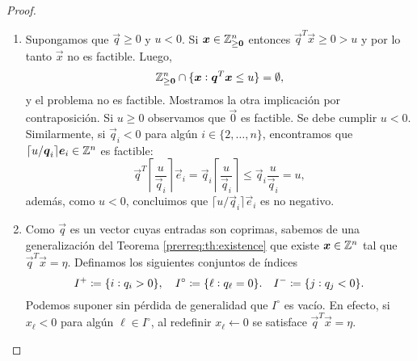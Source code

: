 \begin{proof} \hfill
	\begin{enumerate}
		\item Supongamos que $\vec{q} \geq 0$ y $u < 0$. Si $\boldsymbol{x} \in \mathbb{Z}_{\geq \boldsymbol{0}}^n$
			entonces $\vec{q}^T\vec{x} \geq 0 > u$ y por lo tanto $\vec{x}$ no es factible. Luego,
			\begin{equation*}
				\mathbb{Z}_{\geq \boldsymbol{0}}^{n} \cap \lbrace \boldsymbol{x} \vcentcolon \boldsymbol{q}^T\boldsymbol{x} 
				\leq u \rbrace = \emptyset,
			\end{equation*}
			y el problema no es factible. Mostramos la otra implicación por contraposición. Si $u
			\geq 0$ observamos que $\vec{0}$ es factible. Se debe cumplir $u < 0$. Similarmente, si
			$\vec{q}_i < 0$ para algún $i \in \lbrace 2, \ldots, n \rbrace$, encontramos que $\lceil
			u/\boldsymbol{q}_i \rceil\boldsymbol{e}_i \in \mathbb{Z}^n$ es factible:
			\begin{equation*}
				\vec{q}^T\left\lceil \frac{u}{\vec{q}_i} \right\rceil\vec{e}_i
				= \vec{q}_i \left\lceil \frac{u}{\vec{q}_i} \right\rceil
				\leq \vec{q}_i \frac{u}{\vec{q}_i} = u,
			\end{equation*}
			además, como $u < 0$, concluimos que $\lceil u/\vec{q}_i \rceil\vec{e}_i$ es no negativo.
		\item Como $\vec{q}$ es un vector cuyas entradas son coprimas, sabemos de una generalización
			del Teorema \ref{prerreq:th:existence} que existe $\boldsymbol{x} \in \mathbb{Z}^n$ tal que
			$\vec{q}^T\vec{x} = \eta$. Definamos los siguientes conjuntos de índices
			\begin{equation*}
				I^+ \coloneq \lbrace i \vcentcolon q_i > 0 \rbrace,
				\quad I^\circ \coloneq \lbrace \ell \vcentcolon q_\ell = 0 \rbrace.
				\quad I^- \coloneq \lbrace j \vcentcolon q_j < 0 \rbrace.
			\end{equation*}
			Podemos suponer sin pérdida de generalidad que $I^\circ$ es vacío. En efecto, si $x_\ell
			< 0$ para algún $\ell \in I^\circ$, al redefinir $x_\ell \leftarrow 0$ se satisface
			$\vec{q}^T\vec{x} = \eta$.


\end{enumerate}
\end{proof}
